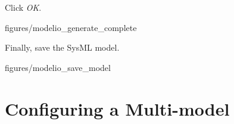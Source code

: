 \documentclass[11pt,a4paper]{../tutorial}
\begin{document}
\begin{instructions}
\item Click \emph{OK}.

\begin{annotation}[width=0.22\linewidth,trim=0 0 0 0,clip]{figures/modelio_generate_complete}
    \end{annotation}

\item Finally, save the SysML model.

\begin{annotation}[width=0.5\linewidth,trim=0 760 500 0,clip]{figures/modelio_save_model}
    \end{annotation}

\end{instructions}

\newpage
\section{Configuring a Multi-model}
\end{document}
